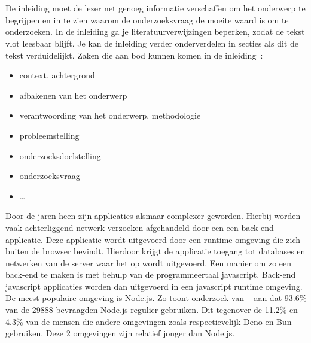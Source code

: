 
\chapter{}%
\label{ch:inleiding}

De inleiding moet de lezer net genoeg informatie verschaffen om het onderwerp te begrijpen en in te zien waarom de onderzoeksvraag de moeite waard is om te onderzoeken. 
In de inleiding ga je literatuurverwijzingen beperken, zodat de tekst vlot leesbaar blijft. 
Je kan de inleiding verder onderverdelen in secties als dit de tekst verduidelijkt.
Zaken die aan bod kunnen komen in de inleiding~\autocite{Pollefliet2011}:

\begin{itemize}
  \item context, achtergrond
  \item afbakenen van het onderwerp
  \item verantwoording van het onderwerp, methodologie
  \item probleemstelling
  \item onderzoeksdoelstelling
  \item onderzoeksvraag
  \item \ldots
\end{itemize}

Door de jaren heen zijn applicaties alsmaar complexer geworden. Hierbij worden vaak achterliggend netwerk verzoeken afgehandeld door een 
een back-end applicatie. Deze applicatie wordt uitgevoerd door een runtime omgeving die zich buiten de browser bevindt.
Hierdoor krijgt de applicatie toegang tot databases en netwerken van de server waar het op wordt uitgevoerd.
Een manier om zo een back-end te maken is met behulp van de programmeertaal javascript. 
Back-end javascript applicaties worden dan uitgevoerd in een javascript runtime omgeving.
De meest populaire omgeving is Node.js. Zo toont onderzoek van ~\textcite{Greif2022} aan dat 93.6\% van de 29888 bevraagden Node.js 
regulier gebruiken.
Dit tegenover de 11.2\% en 4.3\% van de mensen die andere omgevingen zoals respectievelijk Deno en Bun gebruiken.
Deze 2 omgevingen zijn relatief jonger dan Node.js.

\section{}%
\label{sec:probleemstelling}

